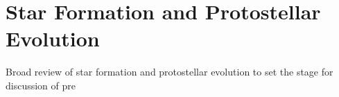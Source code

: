 \section{Star Formation and Protostellar Evolution}
Broad review of star formation and protostellar evolution to set the stage for discussion of pre